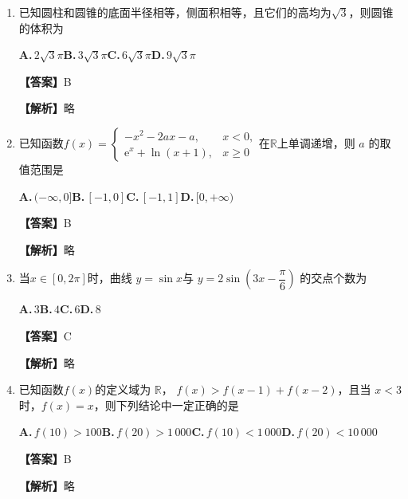 \documentclass[UTF8,a4paper]{ctexart}
\newcommand{\e}{\mathrm{e}}
\begin{document}
\begin{enumerate}[series=s0, leftmargin=2em, itemsep=0.8em]
\item
已知圆柱和圆锥的底面半径相等，侧面积相等，且它们的高均为$\sqrt 3$，则圆锥的体积为


\noindent\textbf{A.}\,$2\sqrt 3\pi$\quad\textbf{B.}\,$3\sqrt 3\pi$\quad\textbf{C.}\,$6\sqrt 3\pi$\quad\textbf{D.}\,$9\sqrt 3\pi$
\par\smallskip



\par\noindent\textbf{【答案】}B
\par\noindent\textbf{【解析】}略



\item
已知函数$f(x)=\begin{cases}-x^2-2ax-a, &x<0, \\ \e^x+\ln(x+1), &x\geqslant 0\end{cases}$在$\mathbb R$上单调递增，则 $a$ 的取值范围是


\noindent\textbf{A.}\,$(-\infty,0]$\quad\textbf{B.}\,$[-1,0]$\quad\textbf{C.}\,$[-1,1]$\quad\textbf{D.}\,$[0,+\infty)$
\par\smallskip



\par\noindent\textbf{【答案】}B
\par\noindent\textbf{【解析】}略



\item
当$x\in[0,2\pi]$时，曲线 $y=\sin x$与 $y=2\sin\left(3x-\dfrac{\pi}{6}\right)$ 的交点个数为


\noindent\textbf{A.}\,$3$\quad\textbf{B.}\,$4$\quad\textbf{C.}\,$6$\quad\textbf{D.}\,$8$
\par\smallskip



\par\noindent\textbf{【答案】}C
\par\noindent\textbf{【解析】}略



\item
已知函数$f(x)$的定义域为 $\mathbb R$， $f(x)>f(x-1)+f(x-2)$，且当 $x<3$时，$f(x)=x$，则下列结论中一定正确的是


\noindent\textbf{A.}\,$f(10)>100$\quad\textbf{B.}\,$f(20)>1\,000$\quad\textbf{C.}\,$f(10)<1\,000$\quad\textbf{D.}\,$f(20)<10\,000$
\par\smallskip



\par\noindent\textbf{【答案】}B
\par\noindent\textbf{【解析】}略


\end{enumerate}
\vspace{1em}
\end{document}
